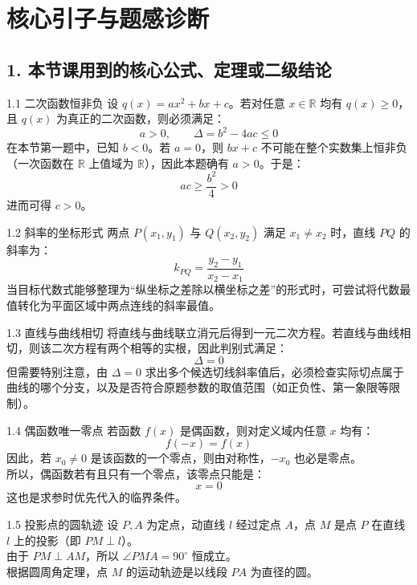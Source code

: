\documentclass[11pt,a4paper]{ctexart}
\begin{document}
\newpage

\section{核心引子与题感诊断}

\subsection{1. 本节课用到的核心公式、定理或二级结论}

\begin{keybox}{1.1 二次函数恒非负}
设 $q(x) = ax^2 + bx + c$。若对任意 $x \in \mathbb{R}$ 均有 $q(x) \ge 0$，且 $q(x)$ 为真正的二次函数，则必须满足：
$$a > 0,\qquad \Delta = b^2 - 4ac \le 0$$
在本节第一题中，已知 $b < 0$。若 $a = 0$，则 $bx + c$ 不可能在整个实数集上恒非负（一次函数在 $\mathbb{R}$ 上值域为 $\mathbb{R}$），因此本题确有 $a > 0$。于是：
$$ac \ge \frac{b^2}{4} > 0$$
进而可得 $c > 0$。
\end{keybox}

\begin{keybox}{1.2 斜率的坐标形式}
两点 $P(x_1, y_1)$ 与 $Q(x_2, y_2)$ 满足 $x_1 \ne x_2$ 时，直线 $PQ$ 的斜率为：
$$k_{PQ} = \frac{y_2 - y_1}{x_2 - x_1}$$
当目标代数式能够整理为“纵坐标之差除以横坐标之差”的形式时，可尝试将代数最值转化为平面区域中两点连线的斜率最值。
\end{keybox}

\begin{keybox}{1.3 直线与曲线相切}
将直线与曲线联立消元后得到一元二次方程。若直线与曲线相切，则该二次方程有两个相等的实根，因此判别式满足：
$$\Delta = 0$$
但需要特别注意，由 $\Delta = 0$ 求出多个候选切线斜率值后，必须检查实际切点属于曲线的哪个分支，以及是否符合原题参数的取值范围（如正负性、第一象限等限制）。
\end{keybox}

\begin{keybox}{1.4 偶函数唯一零点}
若函数 $f(x)$ 是偶函数，则对定义域内任意 $x$ 均有：
$$f(-x) = f(x)$$
因此，若 $x_0 \ne 0$ 是该函数的一个零点，则由对称性，$-x_0$ 也必是零点。\\
所以，偶函数若有且只有一个零点，该零点只能是：
$$x = 0$$
这也是求参时优先代入的临界条件。
\end{keybox}

\begin{keybox}{1.5 投影点的圆轨迹}
设 $P, A$ 为定点，动直线 $l$ 经过定点 $A$，点 $M$ 是点 $P$ 在直线 $l$ 上的投影（即 $PM \perp l$）。\\
由于 $PM \perp AM$，所以 $\angle PMA = 90^\circ$ 恒成立。\\
根据圆周角定理，点 $M$ 的运动轨迹是以线段 $PA$ 为直径的圆。
\end{keybox}
\end{document}
